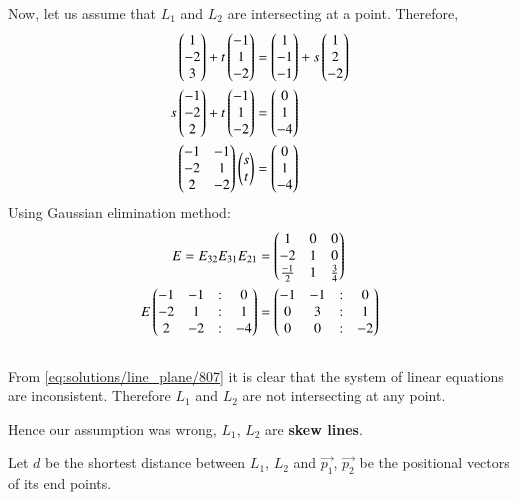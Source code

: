 Now, let us assume that $L_1$ and $L_2$ are intersecting at a point. Therefore,
\begin{align}
\begin{pmatrix}1\\-2\\3\end{pmatrix}+ t\begin{pmatrix}-1\\1\\-2\end{pmatrix}&=\begin{pmatrix}1\\-1\\-1\end{pmatrix}+ s\begin{pmatrix}1\\2\\-2\end{pmatrix}\\
s\begin{pmatrix}-1\\-2\\2\end{pmatrix} + t\begin{pmatrix}-1\\1\\-2\end{pmatrix}&=\begin{pmatrix}0\\1\\-4\end{pmatrix}\\
\begin{pmatrix}-1&-1\\-2&1\\2&-2\end{pmatrix} \begin{pmatrix}s\\t\end{pmatrix}&=\begin{pmatrix}0\\1\\-4\end{pmatrix}
\end{align}
Using Gaussian elimination method:
\begin{align}
 E=E_{32}E_{31}E_{21}&=\begin{pmatrix}1&0&0 \\ -2&1&0 \\\frac{-1}{2}&1&\frac{3}{4}\end{pmatrix}\\
 E\begin{pmatrix}-1&-1&:&0\\-2&1&:&1\\2&-2&:&-4\end{pmatrix}&=\begin{pmatrix}-1&-1&:&0\\0&3&:&1\\0&0&:&-2\end{pmatrix}\label{eq:solutions/line_plane/807}
\end{align}\\

From \eqref{eq:solutions/line_plane/807} it is clear that the system of linear equations are inconsistent. Therefore $L_1$ and $L_2$ are not intersecting at any point. 

Hence our assumption was wrong, $L_1$, $L_2$ are \textbf{skew lines}.

Let $d$ be the shortest distance  between $L_1$, $L_2$ and $\vec{p_1}$, $\vec{p_2}$ be the positional vectors of its end points.

